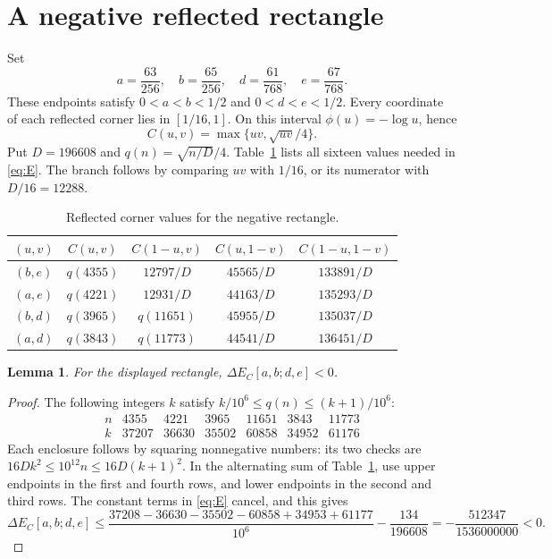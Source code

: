 \documentclass[11pt]{article}
\newtheorem{lemma}[theorem]{Lemma}
\begin{document}
\section{A negative reflected rectangle}
Set
\[
 a=\frac{63}{256},\quad b=\frac{65}{256},\quad
 d=\frac{61}{768},\quad e=\frac{67}{768}.
\]
These endpoints satisfy $0<a<b<1/2$ and $0<d<e<1/2$.
Every coordinate of each reflected corner lies in $[1/16,1]$.
On this interval $\phi(u)=-\log u$, hence
\begin{equation}\label{eq:corner}
 C(u,v)=\max\{uv,\sqrt{uv}/4\}.
\end{equation}
Put $D=196608$ and $q(n)=\sqrt{n/D}/4$. Table~\ref{tab:corners}
lists all sixteen values needed in \eqref{eq:E}. The branch follows by
comparing $uv$ with $1/16$, or its numerator with $D/16=12288$.

\begin{table}[ht]
\centering
\begin{tabular}{ccccc}
\toprule
$(u,v)$ & $C(u,v)$ & $C(1-u,v)$ & $C(u,1-v)$ & $C(1-u,1-v)$\\
\midrule
$(b,e)$ & $q(4355)$ & $12797/D$ & $45565/D$ & $133891/D$\\
$(a,e)$ & $q(4221)$ & $12931/D$ & $44163/D$ & $135293/D$\\
$(b,d)$ & $q(3965)$ & $q(11651)$ & $45955/D$ & $135037/D$\\
$(a,d)$ & $q(3843)$ & $q(11773)$ & $44541/D$ & $136451/D$\\
\bottomrule
\end{tabular}
\caption{Reflected corner values for the negative rectangle.}\label{tab:corners}
\end{table}

\begin{lemma}\label{lem:neg}
For the displayed rectangle, $\Delta E_C[a,b;d,e]<0$.
\end{lemma}
\begin{proof}
The following integers $k$ satisfy $k/10^6\leq q(n)\leq(k+1)/10^6$:
\[
\begin{array}{c|rrrrrr}
n&4355&4221&3965&11651&3843&11773\\\hline
k&37207&36630&35502&60858&34952&61176
\end{array}
\]
Each enclosure follows by squaring nonnegative numbers: its two checks
are $16Dk^2\leq10^{12}n\leq16D(k+1)^2$.
In the alternating sum of Table~\ref{tab:corners}, use upper endpoints
in the first and fourth rows, and lower endpoints in the second and
third rows. The constant terms in \eqref{eq:E} cancel, and this gives
\[
 \Delta E_C[a,b;d,e]\leq
 \frac{37208-36630-35502-60858+34953+61177}{10^6}
 -\frac{134}{196608}
 =-\frac{512347}{1536000000}<0.
\]
\end{proof}
\end{document}
